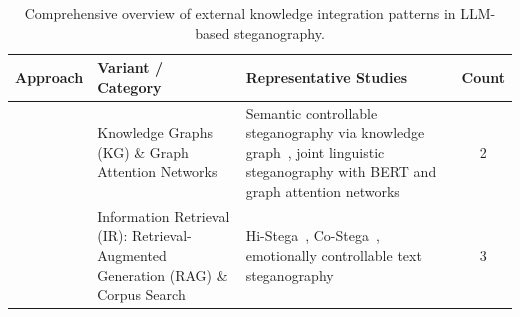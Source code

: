 \begin{table}[t]
  \centering
  \small
  \caption{Comprehensive overview of external knowledge integration patterns in LLM-based steganography.}
  \label{tab:knowledge_integration_comprehensive}
  \begin{tabular}{|>{\raggedright\arraybackslash}p{2cm}|>{\raggedright\arraybackslash}p{2cm}|>{\raggedright\arraybackslash}p{7cm}|c|}
    \hline
    \textbf{Approach}                                   & \textbf{Variant / Category}                                                       & \textbf{Representative Studies}                                                                                                                                                                                                                                                                                                                                                                                                                                                                                                                                                                                                                                                                                                                                                           & \textbf{Count} \\
    \hline
    \multirow{2}{2cm}{Structured Knowledge Integration} & Knowledge Graphs (KG) \& Graph Attention Networks                                 & Semantic controllable steganography via knowledge graph~\cite{li2024semantic}, joint linguistic steganography with BERT and graph attention networks~\cite{ding2023joint}                                                                                                                                                                                                                                                                                                                                                                                                                                                                                                                                                                                                              & 2              \\
    \cline{2-4}
                                                        & Information Retrieval (IR): Retrieval-Augmented Generation (RAG) \& Corpus Search & Hi-Stega~\cite{wang2023hi}, Co-Stega~\cite{liao2024co}, emotionally controllable text steganography~\cite{shi2025emotionally}                                                                                                                                                                                                                                                                                                                                                                                                                                                                                                                                                                                                                                                            & 3              \\

\end{tabular}
\end{table}

